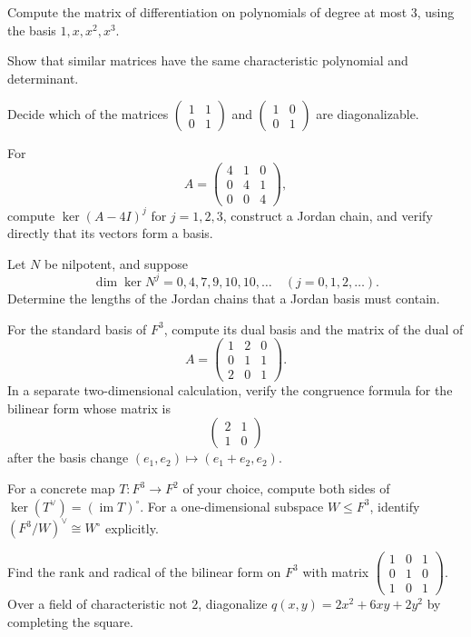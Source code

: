 \begin{exercise}[Core] Compute the matrix of differentiation on polynomials
of degree at most \(3\), using the basis \(1,x,x^2,x^3\).\end{exercise}
\begin{exercise}[Core] Show that similar matrices have the same characteristic
polynomial and determinant.\end{exercise}
\begin{exercise}[Further] Decide which of the matrices
\(\begin{pmatrix}1&1\\0&1\end{pmatrix}\) and
\(\begin{pmatrix}1&0\\0&1\end{pmatrix}\) are diagonalizable.\end{exercise}
\begin{exercise}[Core] For
\[
A=\begin{pmatrix}4&1&0\\0&4&1\\0&0&4\end{pmatrix},
\]
compute \(\ker(A-4I)^j\) for \(j=1,2,3\), construct a Jordan chain, and
verify directly that its vectors form a basis.\end{exercise}
\begin{exercise}[Further] Let \(N\) be nilpotent, and suppose
\[
\dim\ker N^j=0,4,7,9,10,10,\ldots\quad(j=0,1,2,\ldots).
\]
Determine the lengths of the
Jordan chains that a Jordan basis must contain.\end{exercise}
\begin{exercise}[Core] For the standard basis of \(F^3\), compute its dual
basis and the matrix of the dual of
\[
A=\begin{pmatrix}1&2&0\\0&1&1\\2&0&1\end{pmatrix}.
\]
In a separate two-dimensional calculation, verify the congruence formula for
the bilinear form whose matrix is
\[
\begin{pmatrix}2&1\\1&0\end{pmatrix}
\]
after the basis change \((e_1,e_2)\mapsto(e_1+e_2,e_2)\).
\end{exercise}
\begin{exercise}[Core] For a concrete map \(T:F^3\to F^2\) of your choice,
compute both sides of
\(\ker(T^\vee)=(\operatorname{im}T)^\circ\).  For a one-dimensional subspace
\(W\leq F^3\), identify \((F^3/W)^\vee\cong W^\circ\) explicitly.
\end{exercise}
\begin{exercise}[Core] Find the rank and radical of the bilinear form on
\(F^3\) with matrix
\(\begin{pmatrix}1&0&1\\0&1&0\\1&0&1\end{pmatrix}\).  Over a field of
characteristic not \(2\), diagonalize
\(q(x,y)=2x^2+6xy+2y^2\) by completing the square.\end{exercise}
